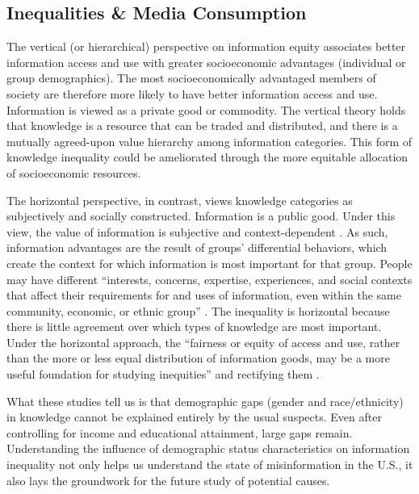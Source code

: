 \documentclass[11pt]{article}
\begin{document}
\subsection{Inequalities \& Media Consumption}

The vertical (or hierarchical) perspective on information equity associates
better information access and use with greater socioeconomic advantages
(individual or group demographics). The most socioeconomically advantaged
members of society are therefore more likely to have better information access
and use. Information is viewed as a private good or commodity. The vertical
theory holds that knowledge is a resource that can be traded and distributed,
and there is a mutually agreed-upon value hierarchy among information
categories. This form of knowledge inequality could be ameliorated through the
more equitable allocation of socioeconomic resources.

The horizontal perspective, in contrast, views knowledge categories as
subjectively and socially constructed. Information is a public good. Under this
view, the value of information is subjective and context-dependent
\citep{Lievrouw}. As such, information advantages are the result of groups'
differential behaviors, which create the context for which information is most
important for that group. People may have different ``interests, concerns,
expertise, experiences, and social contexts that affect their requirements for
and uses of information, even within the same community, economic, or ethnic
group'' \citep[501]{Lievrouw}. The inequality is horizontal because there is
little agreement over which types of knowledge are most important. Under the
horizontal approach, the ``fairness or equity of access and use, rather than the
more or less equal distribution of information goods, may be a more useful
foundation for studying inequities'' and rectifying them \citep[501]{Lievrouw}.


What these studies tell us is that demographic gaps (gender and race/ethnicity) in knowledge cannot be explained entirely by the usual suspects. Even after controlling for income and educational attainment, large gaps remain. Understanding the influence of demographic status characteristics on information inequality not only helps us understand the state of misinformation in the U.S., it also lays the groundwork for the future study of potential causes.
\end{document}
